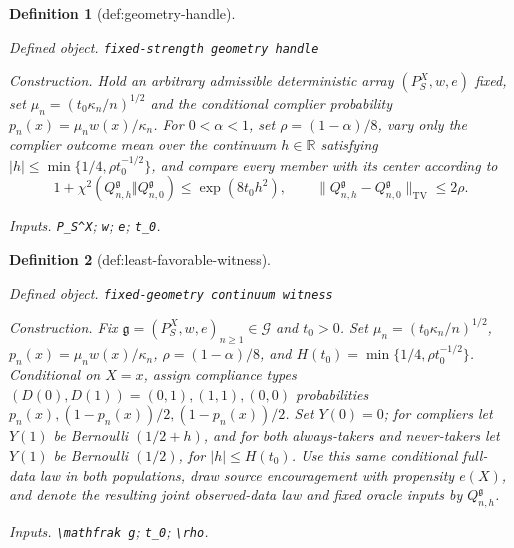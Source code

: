 \documentclass{article}
\newtheorem{definition}{Definition}
\begin{document}
\begin{definition}[def:geometry-handle]\label{def:geometry-handle}
\par\smallskip\noindent\emph{Defined object.} \texttt{fixed-\allowbreak{}strength geometry handle}
\par\smallskip\noindent\emph{Construction.} Hold an arbitrary admissible deterministic array \((P_S^X,w,e)\) fixed, set \(\mu_n=(t_0\kappa_n/n)^{1/2}\) and the conditional complier probability \(p_n(x)=\mu_nw(x)/\kappa_n\).  For \(0<\alpha<1\), set \(\rho=(1-\alpha)/8\), vary only the complier outcome mean over the continuum \(h\in\mathbb R\) satisfying \(|h|\le\min\{1/4,\rho t_0^{-1/2}\}\), and compare every member with its center according to
\[
 1+\chi^2(Q_{n,h}^{\mathfrak g}\Vert Q_{n,0}^{\mathfrak g})\le\exp(8t_0h^2),
 \qquad
 \|Q_{n,h}^{\mathfrak g}-Q_{n,0}^{\mathfrak g}\|_{\mathrm{TV}}\le2\rho.
\]
\par\smallskip\noindent\emph{Inputs.} \texttt{P\_\allowbreak{}S\textasciicircum{}X}; \texttt{w}; \texttt{e}; \texttt{t\_\allowbreak{}0}.
\end{definition}

\begin{definition}[def:least-favorable-witness]\label{def:least-favorable-witness}
\par\smallskip\noindent\emph{Defined object.} \texttt{fixed-\allowbreak{}geometry continuum witness}
\par\smallskip\noindent\emph{Construction.} Fix \(\mathfrak g=(P_S^X,w,e)_{n\ge1}\in\mathcal G\) and \(t_0>0\).  Set \(\mu_n=(t_0\kappa_n/n)^{1/2}\), \(p_n(x)=\mu_nw(x)/\kappa_n\), \(\rho=(1-\alpha)/8\), and \(H(t_0)=\min\{1/4,\rho t_0^{-1/2}\}\).  Conditional on \(X=x\), assign compliance types \((D(0),D(1))=(0,1),(1,1),(0,0)\) probabilities \(p_n(x),(1-p_n(x))/2,(1-p_n(x))/2\).  Set \(Y(0)=0\); for compliers let \(Y(1)\) be Bernoulli \((1/2+h)\), and for both always-takers and never-takers let \(Y(1)\) be Bernoulli \((1/2)\), for \(|h|\le H(t_0)\).  Use this same conditional full-data law in both populations, draw source encouragement with propensity \(e(X)\), and denote the resulting joint observed-data law and fixed oracle inputs by \(Q_{n,h}^{\mathfrak g}\).
\par\smallskip\noindent\emph{Inputs.} \texttt{\textbackslash{}\allowbreak{}mathfrak g}; \texttt{t\_\allowbreak{}0}; \texttt{\textbackslash{}\allowbreak{}rho}.
\end{definition}
\end{document}
